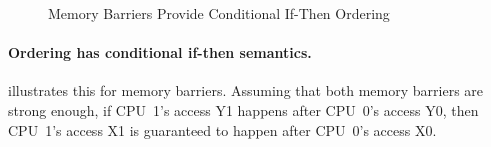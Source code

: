 \begin{figure}
\centering
{}
\caption{Memory Barriers Provide Conditional If-Then Ordering}
\label{fig:memorder:Memory Barriers Provide Conditional If-Then Ordering}
\end{figure}

\paragraph{Ordering has conditional if-then semantics.}
illustrates this for memory barriers.
Assuming that both memory barriers are strong enough, if CPU~1's access
Y1 happens after CPU~0's access Y0, then CPU~1's access X1 is guaranteed
to happen after CPU~0's access X0.

\QuickQuizEnd

